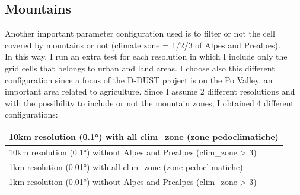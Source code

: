 \subsection{Mountains}
Another important parameter configuration used is to filter or not the cell covered by mountains or not (climate zone = 1/2/3 of Alpes and Prealpes). \\ 
In this way, I run an extra test for each resolution in which I include only the grid cells that belongs to urban and land areas.
I choose also this different configuration since a focus of the D-DUST project is on the Po Valley, an important area related to agriculture.
Since I assume 2 different resolutions and with the possibility to include or not the mountain zones, I obtained 4 different configurations: 
\par
\begin{table}[H]
    \centering
    \begin{tabular}{|l|}
    \hline
        10km resolution (0.1°) with all clim\_zone (zone pedoclimatiche)  \\ \hline
        10km resolution (0.1°) without Alpes and Prealpes (clim\_zone > 3) \\ \hline
        1km resolution (0.01°) with all clim\_zone (zone pedoclimatiche)   \\ \hline
        1km resolution (0.01°) without Alpes and Prealpes (clim\_zone > 3)  \\ \hline
    \end{tabular}
\end{table}
